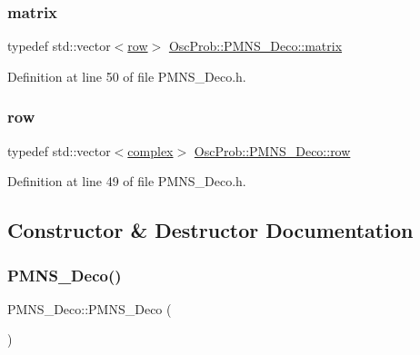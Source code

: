\subsubsection{\texorpdfstring{matrix}{matrix}}
{\footnotesize\ttfamily typedef std\+::vector$<$\hyperlink{classOscProb_1_1PMNS__Deco_a34634741bc68bc1c524cf47f44e7f5b6}{row}$>$ \hyperlink{classOscProb_1_1PMNS__Deco_a77b4e0c041b6268910a270be0f5387c9}{Osc\+Prob\+::\+P\+M\+N\+S\+\_\+\+Deco\+::matrix}}



Definition at line 50 of file P\+M\+N\+S\+\_\+\+Deco.\+h.

\mbox{\label{classOscProb_1_1PMNS__Deco_a34634741bc68bc1c524cf47f44e7f5b6}} 
\subsubsection{\texorpdfstring{row}{row}}
{\footnotesize\ttfamily typedef std\+::vector$<$\hyperlink{classOscProb_1_1PMNS__Base_ae86ec4718808ce9d02e5f5b4226714ab}{complex}$>$ \hyperlink{classOscProb_1_1PMNS__Deco_a34634741bc68bc1c524cf47f44e7f5b6}{Osc\+Prob\+::\+P\+M\+N\+S\+\_\+\+Deco\+::row}}



Definition at line 49 of file P\+M\+N\+S\+\_\+\+Deco.\+h.



\subsection{Constructor \& Destructor Documentation}
\mbox{\label{classOscProb_1_1PMNS__Deco_a976dc43bb65547af5f4a27f5a8fccbba}} 
\subsubsection{\texorpdfstring{P\+M\+N\+S\+\_\+\+Deco()}{PMNS\_Deco()}}
{\footnotesize\ttfamily P\+M\+N\+S\+\_\+\+Deco\+::\+P\+M\+N\+S\+\_\+\+Deco (\begin{DoxyParamCaption}{ }\end{DoxyParamCaption})}

